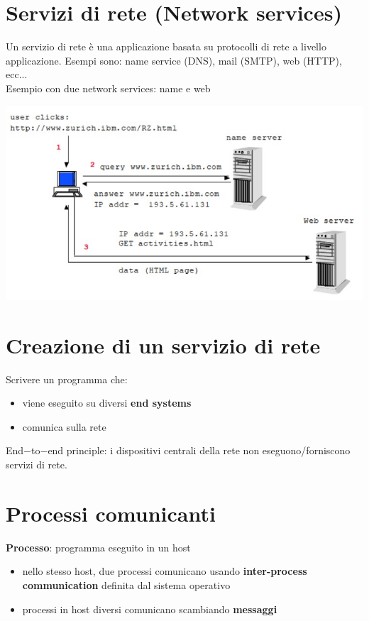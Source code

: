 \section{Servizi di rete (Network services)}
Un servizio di rete è una applicazione basata su protocolli di rete a livello applicazione. Esempi sono: name service (DNS), mail (SMTP), web (HTTP), ecc... \\

Esempio con due network services: name e web
\begin{center}
\includegraphics[scale=0.4]{Images/TecnologieWeb/1/networkservices.jpg}    
\end{center}

\section{Creazione di un servizio di rete}
Scrivere un programma che:
\begin{itemize}
    \item viene eseguito su diversi \textbf{end systems}
    \item comunica sulla rete
\end{itemize}

End$-$to$-$end principle: i dispositivi centrali della rete non eseguono/forniscono servizi di rete.

\section{Processi comunicanti}
\textbf{Processo}: programma eseguito in un host
\begin{itemize}
    \item nello stesso host, due processi comunicano usando \textbf{inter-process communication} definita dal sistema operativo
    \item processi in host diversi comunicano scambiando \textbf{messaggi}
\end{itemize}


